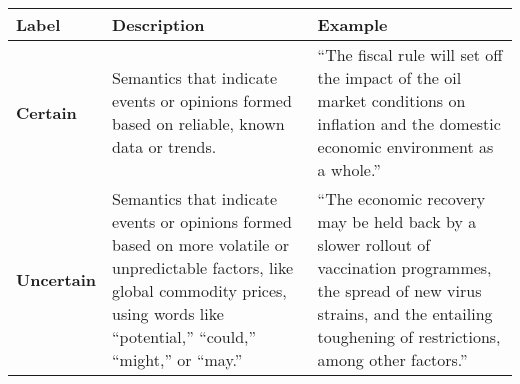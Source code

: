 \begin{table*}
    \caption{}
    \vspace{1em}
    \begin{tabular}{p{}p{}p{}}
    \toprule
    \textbf{Label} & \textbf{Description} & \textbf{Example}\\
    \midrule
    \textbf{Certain} & Semantics that indicate events or opinions formed based on reliable, known data or trends. & “The fiscal rule will set off the impact of the oil market conditions on inflation and the domestic economic environment as a whole.” \\
    \midrule
    \textbf{Uncertain} & Semantics that indicate events or opinions formed based on more volatile or unpredictable factors, like global commodity prices, using words like ``potential,'' ``could,'' ``might,'' or ``may.'' & “The economic recovery may be held back by a slower rollout of vaccination programmes, the spread of new virus strains, and the entailing toughening of restrictions, among other factors.” \\
    \bottomrule
    \end{tabular}
    \label{tb:cbr_certainty_guide}
    \end{table*}
    